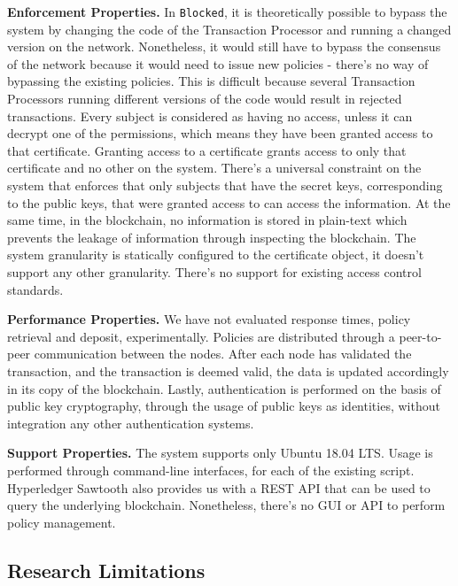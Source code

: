 \textbf{Enforcement Properties.} In \texttt{Blocked}, it is theoretically possible to bypass the system by changing the code of the Transaction Processor and running a changed version on the network. Nonetheless, it would still have to bypass the consensus of the network because it would need to issue new policies - there's no way of bypassing the existing policies. This is difficult because several Transaction Processors running different versions of the code would result in rejected transactions. Every subject is considered as having no access, unless it can decrypt one of the permissions, which means they have been granted access to that certificate. Granting access to a certificate grants access to only that certificate and no other on the system. There's a universal constraint on the system that enforces that only subjects that have the secret keys, corresponding to the public keys, that were granted access to can access the information. At the same time, in the blockchain, no information is stored in plain-text which prevents the leakage of information through inspecting the blockchain. The system granularity is statically configured to the certificate object, it doesn't support any other granularity. There's no support for existing access control standards.

\textbf{Performance Properties.} We have not evaluated response times, policy retrieval and deposit, experimentally. Policies are distributed through a peer-to-peer communication between the nodes. After each node has validated the transaction, and the transaction is deemed valid, the data is updated accordingly in its copy of the blockchain. Lastly, authentication is performed on the basis of public key cryptography, through the usage of public keys as identities, without integration any other authentication systems.

\textbf{Support Properties.} The system supports only Ubuntu 18.04 LTS. Usage is performed through command-line interfaces, for each of the existing script. Hyperledger Sawtooth also provides us with a REST API that can be used to query the underlying blockchain. Nonetheless, there's no GUI or API to perform policy management.

\subsection{Research Limitations}
\label{sec:eval-limitations}


